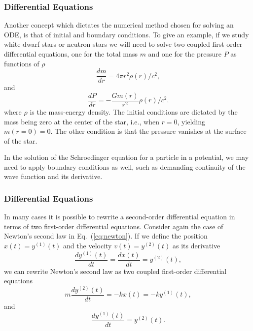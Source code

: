\documentclass{beamer}
\begin{document}
\begin{frame}
\frametitle{Differential Equations}

\begin{block}{}
Another concept which dictates the numerical method chosen
for solving an ODE, is that of initial and boundary conditions.
To give an example, if we study white dwarf stars or neutron stars
we will need to solve two coupled first-order differential
equations, one for the total mass $m$ and one for the 
pressure $P$ as functions of 
$\rho$ 
\[
\frac{dm}{dr}=4\pi r^{2}\rho (r)/c^2,
\]
and
\[
\frac{dP}{dr}=-\frac{Gm(r)}{r^{2}}\rho (r)/c^2.
\]
where $\rho$ is the mass-energy density.
The initial conditions are dictated by the mass being
zero at the center of the star, i.e., when $r=0$,
yielding $m(r=0)=0$. The other condition is that
the pressure vanishes at the surface of the star.

In the solution of the Schroedinger equation for a particle
in a potential, we may need to apply boundary conditions as well,
such as demanding continuity of the wave function and its derivative. 
\end{block}
\end{frame}

\begin{frame}
\frametitle{Differential Equations}

\begin{block}{}
In many cases it is possible to rewrite a second-order
differential equation in terms of two first-order differential
equations. Consider again the case of Newton's second law in Eq.~(\ref{eq:newton}). If we define the position $x(t)=y^{(1)}(t)$ 
and the velocity $v(t)=y^{(2)}(t)$ as its derivative 
\begin{equation} 
   \frac{dy^{(1)}(t)}{dt}=\frac{dx(t)}{dt}=y^{(2)}(t),
\end{equation}
we can rewrite Newton's second law as two coupled first-order
differential equations
\begin{equation} 
   m\frac{dy^{(2)}(t)}{dt}=-kx(t)=-ky^{(1)}(t),
    \label{eq:n1}
\end{equation}
and 
\begin{equation}
\frac{dy^{(1)}(t)}{dt}=y^{(2)}(t). \label{eq:n2}
\end{equation}
\end{block}
\end{frame}
\end{document}

